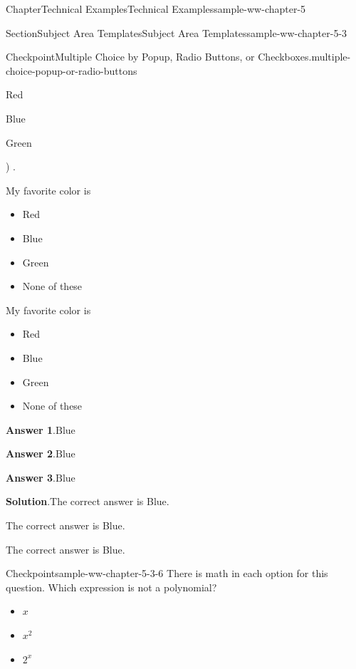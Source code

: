 \documentclass[oneside,10pt,]{book}
\newcommand{\blocktitlefont}{\relax}
\numberwithin{equation}{section}
\begin{document}
\begin{chapterptx}{Chapter}{Technical Examples}{}{Technical Examples}{}{}{sample-ww-chapter-5}
\begin{sectionptx}{Section}{Subject Area Templates}{}{Subject Area Templates}{}{}{sample-ww-chapter-5-3}
\begin{inlineexercise}{Checkpoint}{Multiple Choice by Popup, Radio Buttons, or Checkboxes.}{multiple-choice-popup-or-radio-buttons}
\begin{itemize*}[label=$\square$,leftmargin=3em,itemjoin=\hspace{1em}]
\item{}Red%
\item{}Blue%
\item{}Green%
\end{itemize*})\quad
.%
\par
My favorite color is%
\par
\begin{itemize}[label=$\bigcirc$,leftmargin=3em,]
\item{}Red%
\item{}Blue%
\item{}Green%
\item{}None of these%
\end{itemize}
%
\par
My favorite color is%
\par
%
\begin{itemize}[label=\textbullet]
\item{}Red%
\item{}Blue%
\item{}Green%
\item{}None of these%
\end{itemize}
%
\par\smallskip%
\noindent\textbf{\blocktitlefont Answer 1}.\hypertarget{multiple-choice-popup-or-radio-buttons-3}{}\quad{}\(\text{Blue}\)%
\par\smallskip%
\noindent\textbf{\blocktitlefont Answer 2}.\hypertarget{multiple-choice-popup-or-radio-buttons-4}{}\quad{}\(\text{Blue}\)%
\par\smallskip%
\noindent\textbf{\blocktitlefont Answer 3}.\hypertarget{multiple-choice-popup-or-radio-buttons-5}{}\quad{}\(\text{Blue}\)%
\par\smallskip%
\noindent\textbf{\blocktitlefont Solution}.\hypertarget{multiple-choice-popup-or-radio-buttons-6}{}\quad{}The correct answer is Blue.%
\par
The correct answer is Blue.%
\par
The correct answer is Blue.%
\end{inlineexercise}%
\begin{inlineexercise}{Checkpoint}{}{sample-ww-chapter-5-3-6}%
There is math in each option for this question. Which expression is not a polynomial?%
\par
\begin{itemize}[label=$\bigcirc$,leftmargin=3em,]
\item{}\(\displaystyle x\)%
\item{}\(\displaystyle x^2\)%
\item{}\(\displaystyle 2^x\)%

\end{itemize}
\end{inlineexercise}
\end{sectionptx}
\end{chapterptx}
\end{document}
